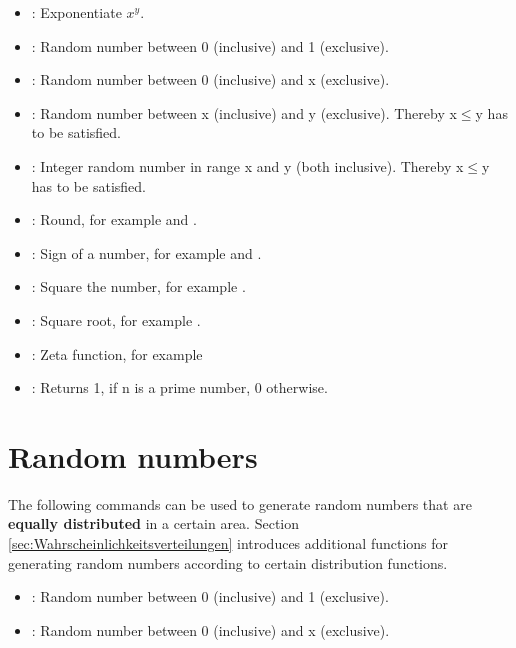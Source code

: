 \begin{itemize}
\item
{}:
Exponentiate $x^y$.

\item
{}:
Random number between 0 (inclusive) and 1 (exclusive).

\item
{}:
Random number between 0 (inclusive) and x (exclusive).

\item
{}:
Random number between x (inclusive) and y (exclusive). Thereby x$\le$y has to be satisfied.

\item
{}:
Integer random number in range x and y (both inclusive). Thereby x$\leq$y has to be satisfied.

\item
{}:
Round, for example  and .

\item
{}:
Sign of a number, for example  and .

\item
{}:
Square the number, for example .

\item
{}:
Square root, for example .

\item
{}:
Zeta function, for example 

\item
{}:
Returns 1, if n is a prime number, 0 otherwise.

\end{itemize}



\section{Random numbers}

The following commands can be used to generate random numbers
that are \textbf{equally distributed} in a certain area.
Section \ref{sec:Wahrscheinlichkeitsverteilungen} introduces
additional functions for generating random numbers according
to certain distribution functions.

\begin{itemize}

\item
{}:
Random number between 0 (inclusive) and 1 (exclusive).

\item
{}:
Random number between 0 (inclusive) and x (exclusive).

\end{itemize}






